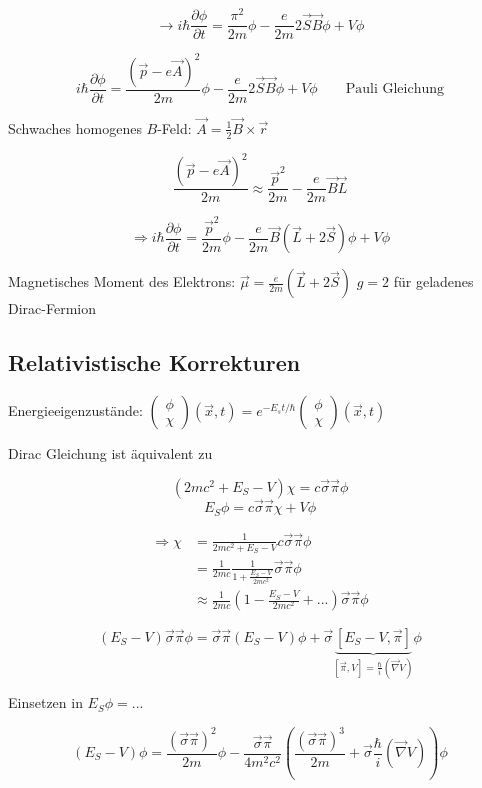 \[\rightarrow i\hbar \frac{\partial \phi}{\partial t} = \frac{\pi^2}{2m}\phi - \frac{e}{2m}2\vec S\vec B\phi + V\phi\]

\[\boxed{i\hbar \frac{\partial \phi}{\partial t} = \frac{(\vec p - e\vec A)^2}{2m}\phi - \frac{e}{2m}2\vec S\vec B\phi+V\phi } \qquad \text{Pauli Gleichung}\]


Schwaches homogenes \(B\)-Feld: \(\vec A = \frac{1}{2}\vec B\times\vec r\)

\[  \frac{(\vec p - e\vec A)^2}{2m} \approx \frac{\vec p^2}{2m} -\frac{e}{2m}\vec B\vec L\]

\[\Rightarrow i\hbar  \frac{\partial \phi}{\partial t} = \frac{\vec p^2}{2m}\phi -\frac{e}{2m}\vec B(\vec L+2\vec S)\phi + V\phi \]


Magnetisches Moment des Elektrons: \(\vec\mu = \frac{e}{2m}(\vec L+2\vec S)\) \(g=2\) für geladenes Dirac-Fermion

\subsection{Relativistische Korrekturen}

Energieeigenzustände: \(\begin{pmatrix}\phi\\\chi\end{pmatrix} (\vec x,t) = e^{-E_st/\hbar}\begin{pmatrix}\phi\\\chi\end{pmatrix} (\vec x,t) \)

Dirac Gleichung ist äquivalent zu

\[(2mc^2+E_S-V)\chi = c\vec\sigma\vec\pi\phi\]
\[E_S\phi = c\vec\sigma\vec\pi\chi + V\phi \]

\begin{align}
\Rightarrow \chi &= \frac{1}{2mc^2+E_S-V}c\vec\sigma\vec\pi\phi \\
&= \frac{1}{2mc}\frac{1}{1 + \frac{E_S-V}{2mc^2}}\vec\sigma\vec\pi\phi \\
&\approx \frac{1}{2mc} (1-\frac{E_S-V}{2mc^2} +...)\vec\sigma\vec\pi\phi
\end{align}


\[(E_S-V)\vec\sigma\vec\pi\phi =\vec\sigma\vec\pi(E_S-V)\phi + \vec\sigma\underbrace{[E_S-V,\vec\pi]}_{[\vec\pi,V]=\frac{\hbar}{i}(\vec\nabla V)}\phi \]

Einsetzen in \(E_S \phi = ...\)

\[(E_S-V)\phi = \frac{(\vec\sigma\vec\pi)^2}{2m}\phi - \frac{\vec\sigma\vec\pi}{4m^2c^2}\left(\frac{(\vec\sigma\vec\pi)^3}{2m} +\vec\sigma \frac{\hbar}{i}(\vec\nabla V)\right)\phi \]


